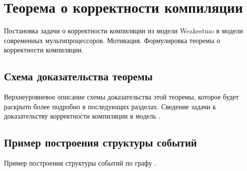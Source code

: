 \pagebreak

\section{Теорема о корректности компиляции}

Постановка задачи о корректности компиляции из модели Weakestmo в
модели современных мультипроцессоров. Мотивация. Формулировка теоремы о
корректности компиляции.

\subsection{Схема доказательства теоремы}

Верхнеуровневое описание схемы доказательства этой теоремы,
которое будет раскрыто более подробно в последующих разделах.
Сведение задачи к доказательству корректности компиляции в модель \IMM.

\subsection{Пример построения структуры событий}

Пример построения структуры событий по графу \IMM.
